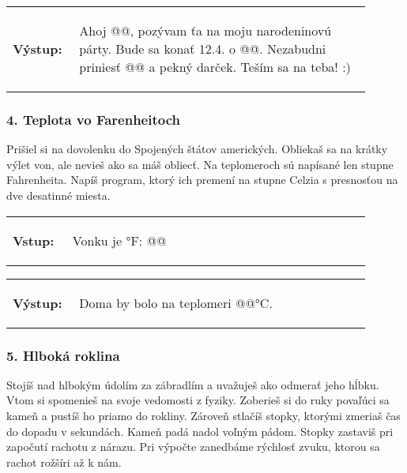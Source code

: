 \vspace{-2em}
\begin{tabular}{@{}p{0.15\linewidth}p{0.75\linewidth}}
\textbf{\small Výstup:} &
\vspace{-3em}
\begin{code}
Ahoj @\fbox{\phantom{vstup}}@,
pozývam ťa na moju narodeninovú párty.
Bude sa konať 12.4. o @\fbox{\phantom{vstup}}@.
Nezabudni priniesť @\fbox{\phantom{vstup}}@ a pekný darček.
Teším sa na teba! :)
\end{code}
\end{tabular}
\vspace{-2em}

\subsubsection*{4. Teplota vo Farenheitoch}
Prišiel si na dovolenku do Spojených štátov amerických. Obliekaš sa na krátky výlet von, ale nevieš ako sa máš obliecť. Na teplomeroch sú napísané len stupne Fahrenheita. Napíš program, ktorý ich premení na stupne Celzia s presnosťou na dve desatinné miesta.

\begin{tabular}{@{}p{0.15\linewidth}p{0.75\linewidth}}
\textbf{\small Vstup:} &
\vspace{-3em}
\begin{code}
Vonku je °F: @\fbox{\phantom{vstup}}@
\end{code}
\end{tabular}

\vspace{-2em}
\begin{tabular}{@{}p{0.15\linewidth}p{0.75\linewidth}}
\textbf{\small Výstup:} &
\vspace{-3em}
\begin{code}
Doma by bolo na teplomeri @\fbox{\phantom{vstup}}@°C.
\end{code}
\end{tabular}
\vspace{-2em}

\subsubsection*{5. Hlboká roklina}
Stojíš nad hlbokým údolím za zábradlím a uvažuješ ako odmerať jeho hĺbku. Vtom si spomenieš na svoje vedomosti z fyziky. Zoberieš si do ruky povaľúci sa kameň a pustíš ho priamo do rokliny. Zároveň stlačíš stopky, ktorými zmeriaš čas do dopadu v sekundách. Kameň padá nadol voľným pádom. Stopky zastaviš pri započutí rachotu z nárazu. Pri výpočte zanedbáme rýchlosť zvuku, ktorou sa rachot rožšíri až k nám.

